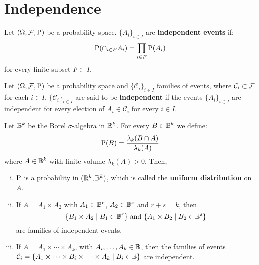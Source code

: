 \section{Independence}

\begin{definition}
	Let $\PS$ be a probability space. $\{ A_i \}_{i \in I }$ are \textbf{independent events} if:
	\[
		\P (\cap_{i \in F} A_i) = \prod_{i \in F} \P(A_i)
	\]
	for every finite subset $F \subset I$.
\end{definition}

\begin{definition}
	Let $\PS$ be a probability space and $\{ \mathcal{C}_i \}_{i \in I}$ families of events, where $\mathcal{C}_i \subset \F$ for each $i \in I$. $\{ \mathcal{C}_i \}_{i \in I}$ are said to be \textbf{independent} if the events $\{ A_i \}_{i \in I }$ are independent for every election of $A_i \in \mathcal{C}_i$ for every $i \in I$.
\end{definition}

\begin{example}
	Let $\B^k$ be the Borel $\sigma$-algebra in $\R^k$. For every $B \in \B^k$ we define:
	\[
		\P(B) = \frac{\lambda_k(B \cap A)}{\lambda_k(A)}
	\]
	where $A \in \B^k$ with finite volume $\lambda_k(A) > 0$. Then,
	\begin{enumerate}[i)]
		\item $\P$ is a probability in $(\R^k, \B^k)$, which is called the \textbf{uniform distribution} on $A$.
		\item If $A = A_1 \times A_2$ with $A_1 \in \B^r$, $A_2 \in \B^s$ and $r + s = k$, then
		\[
			\{ B_1 \times A_2 \mid B_1 \in \B^r \} \text{ and } \{ A_1 \times B_2 \mid B_2 \in \B^s \} 
		\]
		are families of independent events.
		\item If $ A = A_1 \times \cdots \times A_k$, with $A_i, \ldots, A_k \in \B$, then the families of events $\mathcal{C}_i = \{ A_1 \times \cdots \times B_i \times \cdots \times A_k \mid B_i \in \B \}$ are independent.
	\end{enumerate}
\end{example}
